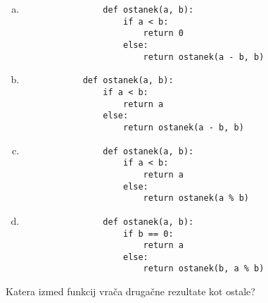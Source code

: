 \documentclass[arhiv, 10pt]{../izpit}
\begin{document}
        \begin{multicols}{2}
        \begin{enumerate}[(a)]
\item 
                \begin{verbatim}
                def ostanek(a, b):
                    if a < b:
                        return 0
                    else:
                        return ostanek(a - b, b)
                \end{verbatim}
            
\item 
            \begin{verbatim}
            def ostanek(a, b):
                if a < b:
                    return a
                else:
                    return ostanek(a - b, b)
            \end{verbatim}
        
\item 
                \begin{verbatim}
                def ostanek(a, b):
                    if a < b:
                        return a
                    else:
                        return ostanek(a % b)
                \end{verbatim}
            
\item 
                \begin{verbatim}
                def ostanek(a, b):
                    if b == 0:
                        return a
                    else:
                        return ostanek(b, a % b)
                \end{verbatim}
            
\end{enumerate}

        \end{multicols}
    
        \naloga*
        
        Katera izmed funkcij vrača drugačne rezultate kot ostale?
    
\end{document}
